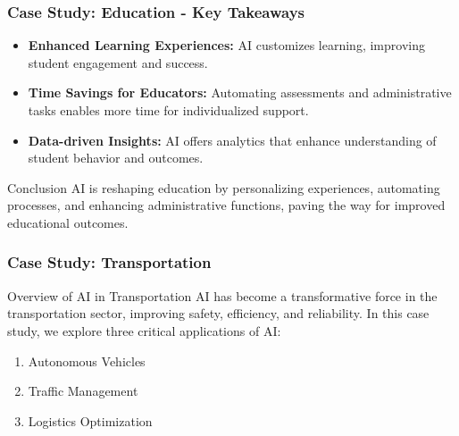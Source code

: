 \documentclass[aspectratio=169]{beamer}
\begin{document}
\begin{frame}[fragile]
    \frametitle{Case Study: Education - Key Takeaways}
    \begin{itemize}
        \item \textbf{Enhanced Learning Experiences:} AI customizes learning, improving student engagement and success.
        \item \textbf{Time Savings for Educators:} Automating assessments and administrative tasks enables more time for individualized support.
        \item \textbf{Data-driven Insights:} AI offers analytics that enhance understanding of student behavior and outcomes.
    \end{itemize}
    \begin{block}{Conclusion}
        AI is reshaping education by personalizing experiences, automating processes, and enhancing administrative functions, paving the way for improved educational outcomes.
    \end{block}
\end{frame}

\begin{frame}[fragile]
    \frametitle{Case Study: Transportation}
    \begin{block}{Overview of AI in Transportation}
        AI has become a transformative force in the transportation sector, improving safety, efficiency, and reliability. 
        In this case study, we explore three critical applications of AI:
        \begin{enumerate}
            \item Autonomous Vehicles
            \item Traffic Management
            \item Logistics Optimization
        \end{enumerate}
    \end{block}
\end{frame}
\end{document}
